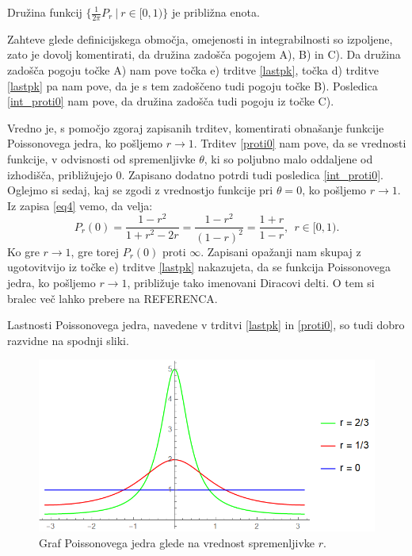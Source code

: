\documentclass[mat1]{fmfdelo}
\begin{document}
    \begin{trditev}
        Družina funkcij $\{ \frac{1}{2 \pi} P_r~|~r \in [0,1)\}$ je približna enota.
    \end{trditev}
    \begin{dokaz}
        Zahteve glede definicijskega območja, omejenosti in integrabilnosti so izpoljene, zato je dovolj komentirati, da družina zadošča pogojem A), B) in C). 
        Da družina zadošča pogoju točke A) nam pove točka e) trditve \ref{lastpk}, točka d) trditve \ref{lastpk} pa nam pove, da je s tem zadoščeno tudi pogoju točke B). 
        Posledica \ref{int_proti0} nam pove, da družina zadošča tudi pogoju iz točke C).
    \end{dokaz}
    \begin{opomba}
        Vredno je, s pomočjo zgoraj zapisanih trditev, komentirati obnašanje funkcije Poissonovega jedra, ko pošljemo $r \to 1$. Trditev \ref{proti0} nam pove, da se vrednosti funkcije, v odvisnosti od spremenljivke $\theta$, ki so poljubno malo oddaljene od izhodišča, približujejo $0$. 
        Zapisano dodatno potrdi tudi posledica \ref{int_proti0}.
        Oglejmo si sedaj, kaj se zgodi z vrednostjo funkcije pri $\theta = 0$, ko pošljemo $r \to 1$. Iz zapisa \eqref{eq4} vemo, da velja:
        $$
        P_r(0) = \frac{1-r^2}{1+ r^2 - 2r} = \frac{1- r^2}{(1 - r)^2} = \frac{1 + r}{1 -r},~~r \in [0,1).
        $$
        Ko gre $r \to 1$, gre torej $P_r(0)$ proti $\infty$. Zapisani opažanji nam skupaj z ugotovitvijo iz točke e) trditve \ref{lastpk} nakazujeta, da se funkcija Poissonovega jedra, ko pošljemo $r \to 1$, približuje tako imenovani Diracovi delti. 
        O tem si bralec več lahko prebere na REFERENCA.
    \end{opomba}

    \begin{opomba}
        Lastnosti Poissonovega jedra, navedene v trditvi \ref{lastpk} in \ref{proti0}, so tudi dobro razvidne na spodnji sliki. 
    \end{opomba}

    \begin{figure}[H]
        \begin{center}
        \includegraphics[width=\linewidth]{grafi.png}
        \caption{Graf Poissonovega jedra glede na vrednost spremenljivke $r$.}
        \end{center}    
    \end{figure}
\end{document}
